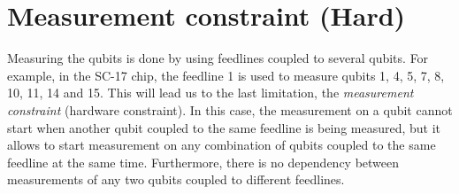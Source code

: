 \documentclass[11pt]{article}
\begin{document}











     



\section{Measurement constraint (Hard)}
\label{sec:org58adcb1}

Measuring the qubits is done by using feedlines coupled to several qubits.
For example, in the SC-17 chip, the feedline 1 is used to measure qubits 1, 4, 5, 7, 8, 10, 11, 14 and 15. This will lead us to the last limitation, the \emph{measurement constraint} (hardware constraint). In this case, the measurement on a qubit cannot start when
another qubit coupled to the same feedline is being measured, but it
allows to start measurement on any combination of qubits coupled to
the same feedline at the same time.  Furthermore, there is no dependency between
measurements of any two qubits coupled to different feedlines.
\end{document}

